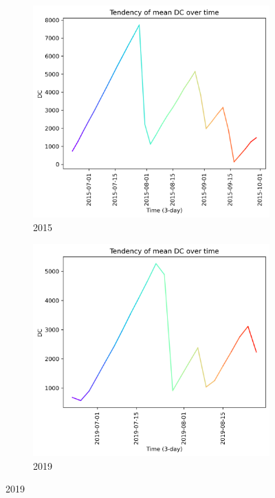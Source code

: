 \begin{figure}[h]
	\caption{DC mean tendency graph}
	\centering
	\begin{subfigure}{0.49\textwidth}
		\centering
		\includegraphics[width=\textwidth]{graphs/2015/tendency/2015_tendency_graph_DC.png}
		\caption{2015}
		\label{fig:mean_tendency_dc_2015}
	\end{subfigure}
	\hfill
	\begin{subfigure}{0.49\textwidth}
		\centering
		\includegraphics[width=\textwidth]{graphs/2019/tendency/2019_tendency_graph_DC.png}
		\caption{2019}
		\label{fig:mean_tendency_dc_2019}
	\end{subfigure}
	\label{fig:mean_tendency_dc}
\end{figure}

